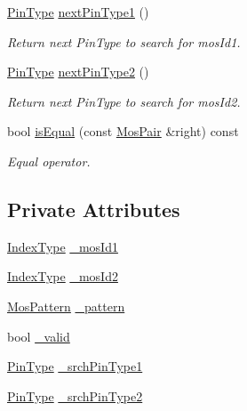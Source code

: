 \begin{DoxyCompactItemize}
\hyperlink{type_8h_afaab50027002ecbb6c8ac27e727d1bb4}{Pin\+Type} \hyperlink{classMosPair_a533ead636fe63d9b3b9deed09e14a3b3}{next\+Pin\+Type1} ()
\begin{DoxyCompactList}\small\item\em Return next Pin\+Type to search for mos\+Id1. \end{DoxyCompactList}\item 
\hyperlink{type_8h_afaab50027002ecbb6c8ac27e727d1bb4}{Pin\+Type} \hyperlink{classMosPair_adc8c1ea8aff3b461f0d09652d1e730f8}{next\+Pin\+Type2} ()
\begin{DoxyCompactList}\small\item\em Return next Pin\+Type to search for mos\+Id2. \end{DoxyCompactList}\item 
bool \hyperlink{classMosPair_a4e4d694485bcc5c7c14981abef32774c}{is\+Equal} (const \hyperlink{classMosPair}{Mos\+Pair} \&right) const
\begin{DoxyCompactList}\small\item\em Equal operator. \end{DoxyCompactList}\end{DoxyCompactItemize}
\subsection*{Private Attributes}
\begin{DoxyCompactItemize}
\item 
\hyperlink{type_8h_a581e8093e28e7362f2b6937296190676}{Index\+Type} \hyperlink{classMosPair_a783f254c414a4b746eadbb9d2e49281b}{\+\_\+mos\+Id1}
\item 
\hyperlink{type_8h_a581e8093e28e7362f2b6937296190676}{Index\+Type} \hyperlink{classMosPair_a4d44569f1b7537fddae9f4c89d5c0f96}{\+\_\+mos\+Id2}
\item 
\hyperlink{type_8h_af19eddb079bfea723256710b029c38e8}{Mos\+Pattern} \hyperlink{classMosPair_a075dadc02f1a5b85d53bf7b2271f8825}{\+\_\+pattern}
\item 
bool \hyperlink{classMosPair_a7a0adcf1db1e0b59d09f1a4270bf8efb}{\+\_\+valid}
\item 
\hyperlink{type_8h_afaab50027002ecbb6c8ac27e727d1bb4}{Pin\+Type} \hyperlink{classMosPair_a54111cc25c62331c5c4e3c0aee23ac54}{\+\_\+srch\+Pin\+Type1}
\item 
\hyperlink{type_8h_afaab50027002ecbb6c8ac27e727d1bb4}{Pin\+Type} \hyperlink{classMosPair_ad05a079ecda10e5527b3c8d5b11f6ac2}{\+\_\+srch\+Pin\+Type2}
\end{DoxyCompactItemize}


